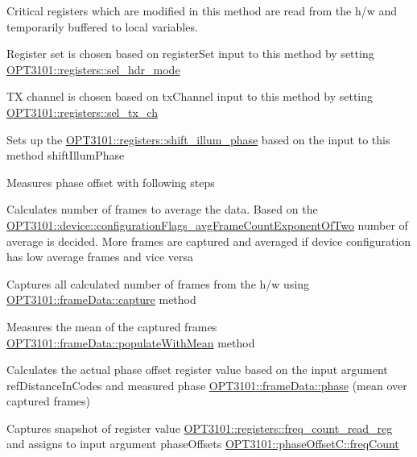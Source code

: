 \begin{DoxyItemize}
\item Critical registers which are modified in this method are read from the h/w and temporarily buffered to local variables.
\item Register set is chosen based on register\+Set input to this method by setting \mbox{\hyperlink{class_o_p_t3101_1_1registers_a1f8f226c3e13479d0dafeb402d35d519}{O\+P\+T3101\+::registers\+::sel\+\_\+hdr\+\_\+mode}}
\item TX channel is chosen based on tx\+Channel input to this method by setting \mbox{\hyperlink{class_o_p_t3101_1_1registers_af79e0b3cfd511e7aa03cf3e55774f0d0}{O\+P\+T3101\+::registers\+::sel\+\_\+tx\+\_\+ch}}
\item Sets up the \mbox{\hyperlink{class_o_p_t3101_1_1registers_a18539cc6fd63ce4f504fcf16b1e48f31}{O\+P\+T3101\+::registers\+::shift\+\_\+illum\+\_\+phase}} based on the input to this method shift\+Illum\+Phase
\item Measures phase offset with following steps
\item Calculates number of frames to average the data. Based on the \mbox{\hyperlink{class_o_p_t3101_1_1device_aa2216815a45a5641629331b10fd1ba2e}{O\+P\+T3101\+::device\+::configuration\+Flags\+\_\+avg\+Frame\+Count\+Exponent\+Of\+Two}} number of average is decided. More frames are captured and averaged if device configuration has low average frames and vice versa
\item Captures all calculated number of frames from the h/w using \mbox{\hyperlink{class_o_p_t3101_1_1frame_data_a0ea9d9f3fc2d25e28e77855f4db8e2a6}{O\+P\+T3101\+::frame\+Data\+::capture}} method
\item Measures the mean of the captured frames \mbox{\hyperlink{class_o_p_t3101_1_1frame_data_a2fe90347589e7c97cc9fade2c68fa10f}{O\+P\+T3101\+::frame\+Data\+::populate\+With\+Mean}} method
\item Calculates the actual phase offset register value based on the input argument ref\+Distance\+In\+Codes and measured phase \mbox{\hyperlink{class_o_p_t3101_1_1frame_data_af8661d11405953dc378ad4d7cb0f2db6}{O\+P\+T3101\+::frame\+Data\+::phase}} (mean over captured frames)
\item Captures snapshot of register value \mbox{\hyperlink{class_o_p_t3101_1_1registers_a0d343738560c0bc418f34b458735a811}{O\+P\+T3101\+::registers\+::freq\+\_\+count\+\_\+read\+\_\+reg}} and assigns to input argument phase\+Offset\textquotesingle{}s \mbox{\hyperlink{class_o_p_t3101_1_1phase_offset_c_ab95e4dde3ea8b0ad825d315160fe33ca}{O\+P\+T3101\+::phase\+Offset\+C\+::freq\+Count}}

\end{DoxyItemize}
